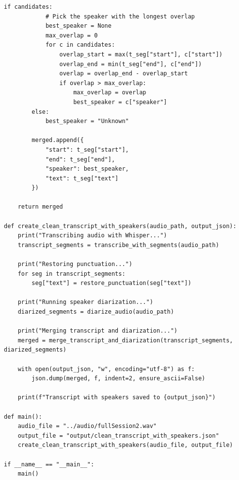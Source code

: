 \begin{lstlisting}[style=pythonstyle, caption={transcribe.py}, label={lst:transcribe.py}]
        if candidates:
            # Pick the speaker with the longest overlap
            best_speaker = None
            max_overlap = 0
            for c in candidates:
                overlap_start = max(t_seg["start"], c["start"])
                overlap_end = min(t_seg["end"], c["end"])
                overlap = overlap_end - overlap_start
                if overlap > max_overlap:
                    max_overlap = overlap
                    best_speaker = c["speaker"]
        else:
            best_speaker = "Unknown"

        merged.append({
            "start": t_seg["start"],
            "end": t_seg["end"],
            "speaker": best_speaker,
            "text": t_seg["text"]
        })

    return merged

def create_clean_transcript_with_speakers(audio_path, output_json):
    print("Transcribing audio with Whisper...")
    transcript_segments = transcribe_with_segments(audio_path)

    print("Restoring punctuation...")
    for seg in transcript_segments:
        seg["text"] = restore_punctuation(seg["text"])

    print("Running speaker diarization...")
    diarized_segments = diarize_audio(audio_path)

    print("Merging transcript and diarization...")
    merged = merge_transcript_and_diarization(transcript_segments, diarized_segments)

    with open(output_json, "w", encoding="utf-8") as f:
        json.dump(merged, f, indent=2, ensure_ascii=False)

    print(f"Transcript with speakers saved to {output_json}")

def main():
    audio_file = "../audio/fullSession2.wav"
    output_file = "output/clean_transcript_with_speakers.json"
    create_clean_transcript_with_speakers(audio_file, output_file)

if __name__ == "__main__":
    main()

\end{lstlisting}

